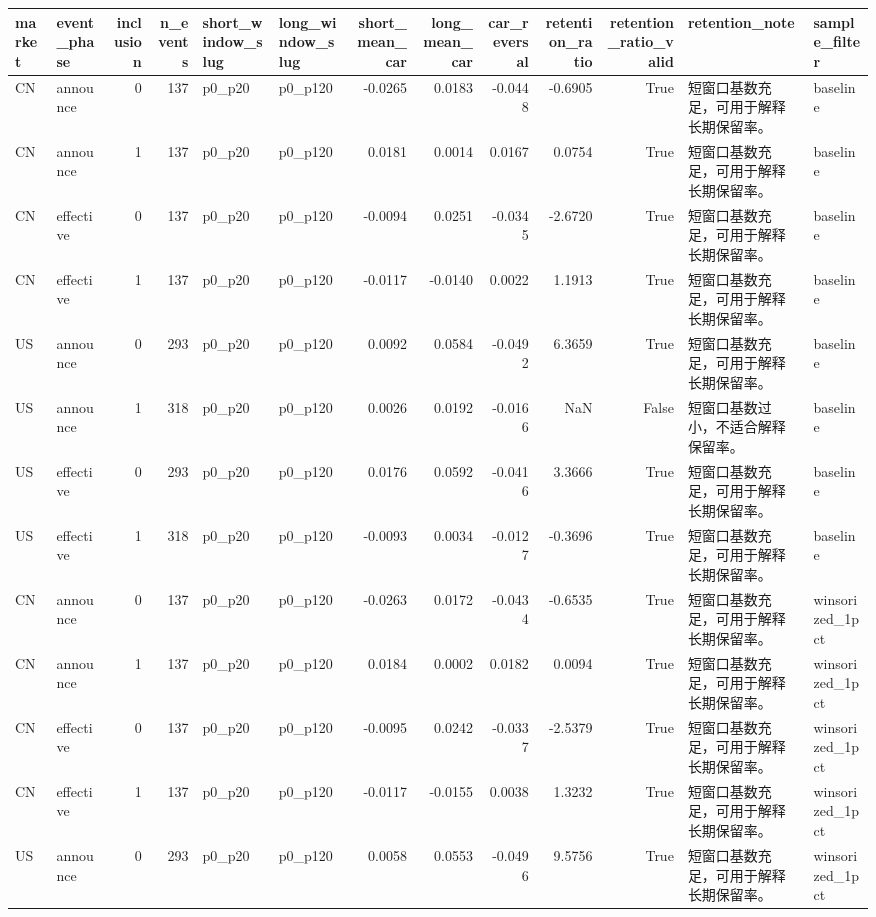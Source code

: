 \begin{tabular}{llrrllrrrrrll}
\toprule
market & event_phase & inclusion & n_events & short_window_slug & long_window_slug & short_mean_car & long_mean_car & car_reversal & retention_ratio & retention_ratio_valid & retention_note & sample_filter \\
\midrule
CN & announce & 0 & 137 & p0_p20 & p0_p120 & -0.0265 & 0.0183 & -0.0448 & -0.6905 & True & 短窗口基数充足，可用于解释长期保留率。 & baseline \\
CN & announce & 1 & 137 & p0_p20 & p0_p120 & 0.0181 & 0.0014 & 0.0167 & 0.0754 & True & 短窗口基数充足，可用于解释长期保留率。 & baseline \\
CN & effective & 0 & 137 & p0_p20 & p0_p120 & -0.0094 & 0.0251 & -0.0345 & -2.6720 & True & 短窗口基数充足，可用于解释长期保留率。 & baseline \\
CN & effective & 1 & 137 & p0_p20 & p0_p120 & -0.0117 & -0.0140 & 0.0022 & 1.1913 & True & 短窗口基数充足，可用于解释长期保留率。 & baseline \\
US & announce & 0 & 293 & p0_p20 & p0_p120 & 0.0092 & 0.0584 & -0.0492 & 6.3659 & True & 短窗口基数充足，可用于解释长期保留率。 & baseline \\
US & announce & 1 & 318 & p0_p20 & p0_p120 & 0.0026 & 0.0192 & -0.0166 & NaN & False & 短窗口基数过小，不适合解释保留率。 & baseline \\
US & effective & 0 & 293 & p0_p20 & p0_p120 & 0.0176 & 0.0592 & -0.0416 & 3.3666 & True & 短窗口基数充足，可用于解释长期保留率。 & baseline \\
US & effective & 1 & 318 & p0_p20 & p0_p120 & -0.0093 & 0.0034 & -0.0127 & -0.3696 & True & 短窗口基数充足，可用于解释长期保留率。 & baseline \\
CN & announce & 0 & 137 & p0_p20 & p0_p120 & -0.0263 & 0.0172 & -0.0434 & -0.6535 & True & 短窗口基数充足，可用于解释长期保留率。 & winsorized_1pct \\
CN & announce & 1 & 137 & p0_p20 & p0_p120 & 0.0184 & 0.0002 & 0.0182 & 0.0094 & True & 短窗口基数充足，可用于解释长期保留率。 & winsorized_1pct \\
CN & effective & 0 & 137 & p0_p20 & p0_p120 & -0.0095 & 0.0242 & -0.0337 & -2.5379 & True & 短窗口基数充足，可用于解释长期保留率。 & winsorized_1pct \\
CN & effective & 1 & 137 & p0_p20 & p0_p120 & -0.0117 & -0.0155 & 0.0038 & 1.3232 & True & 短窗口基数充足，可用于解释长期保留率。 & winsorized_1pct \\
US & announce & 0 & 293 & p0_p20 & p0_p120 & 0.0058 & 0.0553 & -0.0496 & 9.5756 & True & 短窗口基数充足，可用于解释长期保留率。 & winsorized_1pct \\

\end{tabular}
